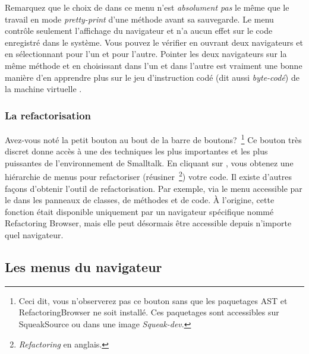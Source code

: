 \documentclass[a4paper,10pt,twoside]{book}
\begin{document}
Remarquez que le choix de  dans ce menu n'est \emph{absolument pas} le m\^eme que le travail en mode \emph{pretty-print} d'une m\'ethode
avant sa sauvegarde.
Le menu contr\^ole seulement l'affichage du navigateur et n'a aucun effet sur
le code enregistr\'e dans le syst\`eme.
Vous pouvez le v\'erifier en ouvrant deux navigateurs et en s\'electionnant
 pour l'un et  pour l'autre.
Pointer les deux navigateurs sur la m\^eme m\'ethode et en choisissant
 dans l'un et  dans l'autre est vraiment
une bonne mani\`ere d'en apprendre plus sur le jeu d'instruction cod\'e
(dit aussi \emph{byte-cod\'e}) de la machine virtuelle \sq.

\subsubsection{La refactorisation}


Avez-vous not\'e la petit bouton  au bout de la barre de 
boutons?~\footnote{Ceci dit, vous n'observerez pas ce bouton sans
que les paquetages AST et RefactoringBrowser ne soit install\'e. Ces
paquetages sont accessibles sur SqueakSource ou dans une image \emph{Squeak-dev}.}
Ce bouton tr\`es discret donne acc\`es \`a une des techniques
les plus importantes et les plus puissantes de l'environnement de
Smalltalk.
En cliquant sur , vous obtenez une hi\'erarchie de menus
pour refactoriser (\cad r\'eusiner~\footnote{\emph{Refactoring} en anglais.}) votre code.
Il existe d'autres fa\c{c}ons d'obtenir l'outil de refactorisation. Par
exemple, via le menu accessible par le  dans les
panneaux de classes, de m\'ethodes et de code.
\`A l'origine, cette fonction \'etait disponible uniquement
par un navigateur sp\'ecifique nomm\'e Refactoring Browser, mais
elle peut d\'esormais \^etre accessible depuis n'importe quel navigateur.

\subsection{Les menus du navigateur}
\end{document}
